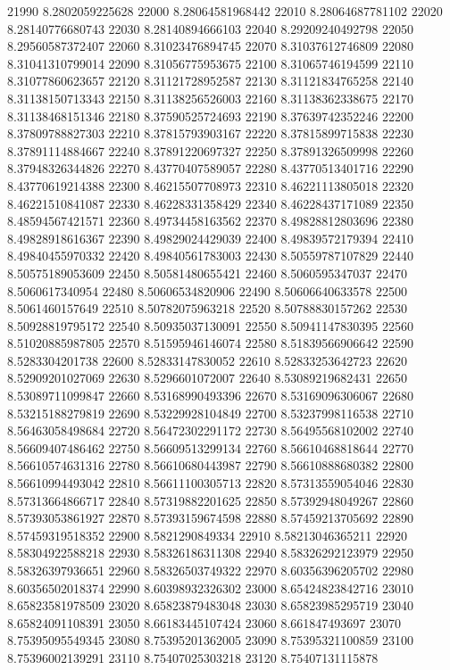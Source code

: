 {21990 8.2802059225628
22000 8.28064581968442
22010 8.28064687781102
22020 8.28140776680743
22030 8.28140894666103
22040 8.29209240492798
22050 8.29560587372407
22060 8.31023476894745
22070 8.31037612746809
22080 8.31041310799014
22090 8.31056775953675
22100 8.31065746194599
22110 8.31077860623657
22120 8.31121728952587
22130 8.31121834765258
22140 8.31138150713343
22150 8.31138256526003
22160 8.31138362338675
22170 8.31138468151346
22180 8.37590525724693
22190 8.37639742352246
22200 8.37809788827303
22210 8.37815793903167
22220 8.37815899715838
22230 8.37891114884667
22240 8.37891220697327
22250 8.37891326509998
22260 8.37948326344826
22270 8.43770407589057
22280 8.43770513401716
22290 8.43770619214388
22300 8.46215507708973
22310 8.46221113805018
22320 8.46221510841087
22330 8.46228331358429
22340 8.46228437171089
22350 8.48594567421571
22360 8.49734458163562
22370 8.49828812803696
22380 8.49828918616367
22390 8.49829024429039
22400 8.49839572179394
22410 8.49840455970332
22420 8.49840561783003
22430 8.50559787107829
22440 8.50575189053609
22450 8.50581480655421
22460 8.5060595347037
22470 8.5060617340954
22480 8.50606534820906
22490 8.50606640633578
22500 8.5061460157649
22510 8.50782075963218
22520 8.50788830157262
22530 8.50928819795172
22540 8.50935037130091
22550 8.50941147830395
22560 8.51020885987805
22570 8.51595946146074
22580 8.51839566906642
22590 8.5283304201738
22600 8.52833147830052
22610 8.52833253642723
22620 8.52909201027069
22630 8.5296601072007
22640 8.53089219682431
22650 8.53089711099847
22660 8.53168990493396
22670 8.53169096306067
22680 8.53215188279819
22690 8.53229928104849
22700 8.53237998116538
22710 8.56463058498684
22720 8.56472302291172
22730 8.56495568102002
22740 8.56609407486462
22750 8.56609513299134
22760 8.56610468818644
22770 8.56610574631316
22780 8.56610680443987
22790 8.56610888680382
22800 8.56610994493042
22810 8.56611100305713
22820 8.57313559054046
22830 8.57313664866717
22840 8.57319882201625
22850 8.57392948049267
22860 8.57393053861927
22870 8.57393159674598
22880 8.57459213705692
22890 8.57459319518352
22900 8.5821290849334
22910 8.58213046365211
22920 8.58304922588218
22930 8.58326186311308
22940 8.58326292123979
22950 8.58326397936651
22960 8.58326503749322
22970 8.60356396205702
22980 8.60356502018374
22990 8.60398932326302
23000 8.65424823842716
23010 8.65823581978509
23020 8.65823879483048
23030 8.65823985295719
23040 8.65824091108391
23050 8.66183445107424
23060 8.661847493697
23070 8.75395095549345
23080 8.75395201362005
23090 8.75395321100859
23100 8.75396002139291
23110 8.75407025303218
23120 8.75407131115878
}
